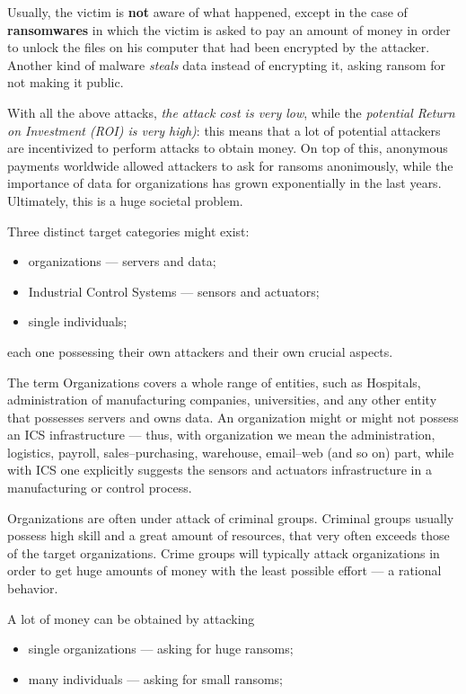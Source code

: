 \documentclass[10pt]{\classname}
\begin{document}
Usually, the victim is \textbf{not} aware of what happened, except in the case
of \textbf{ransomwares} in which the victim is asked to pay an amount of money
in order to unlock the files on his computer that had been encrypted by the
attacker. Another kind of malware \emph{steals} data instead of encrypting it,
asking ransom for not making it public.

With all the above attacks, \emph{the attack cost is very low}, while the
\emph{potential Return on Investment (ROI) is very high)}: this means that a
lot of potential attackers are incentivized to perform attacks to obtain money.
On top of this, anonymous payments worldwide allowed attackers to ask for
ransoms anonimously, while the importance of data for organizations has grown
exponentially in the last years. Ultimately, this is a huge societal problem.

Three distinct target categories might exist:
\begin{itemize}
    \item organizations --- servers and data;
    \item Industrial Control Systems --- sensors and actuators;
    \item single individuals;
\end{itemize}

each one possessing their own attackers and their own crucial aspects.

The term Organizations covers a whole range of entities, such as Hospitals,
administration of manufacturing companies, universities, and any other entity
that possesses servers and owns data. An organization might or might not
possess an ICS infrastructure --- thus, with organization we mean the
administration, logistics, payroll, sales\---purchasing, warehouse,
email\---web (and so on) part, while with ICS one explicitly suggests the
sensors and actuators infrastructure in a manufacturing or control process.

Organizations are often under attack of criminal groups. Criminal groups
usually possess high skill and a great amount of resources, that very often
exceeds those of the target organizations. Crime groups will typically attack
organizations in order to get huge amounts of money with the least possible
effort --- a rational behavior.

A lot of money can be obtained by attacking
\begin{itemize}
    \item single organizations --- asking for huge ransoms;
    \item many individuals --- asking for small ransoms;
\end{itemize}
\end{document}
